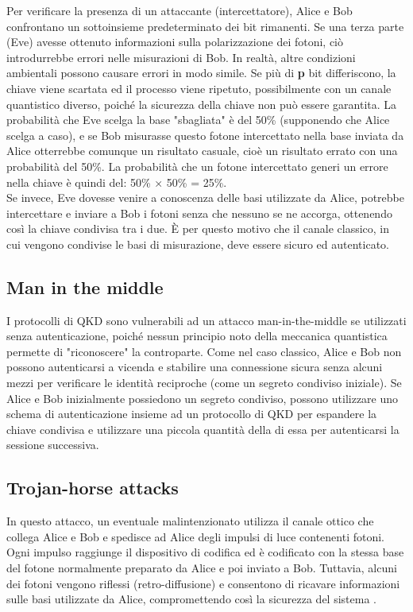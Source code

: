 \noindent Per verificare la presenza di un attaccante (intercettatore), Alice e Bob confrontano un sottoinsieme predeterminato dei bit rimanenti. Se una terza parte (Eve) avesse ottenuto informazioni sulla polarizzazione dei fotoni, ciò introdurrebbe errori nelle misurazioni di Bob. In realtà, altre condizioni ambientali possono causare errori in modo simile. Se più di \textbf{p} bit differiscono, la chiave viene scartata ed il processo viene ripetuto, possibilmente con un canale quantistico diverso, poiché la sicurezza della chiave non può essere garantita.
La probabilità che Eve scelga la base "sbagliata" è del 50\% (supponendo che Alice scelga a caso), e se Bob misurasse questo fotone intercettato nella base inviata da Alice otterrebbe comunque un risultato casuale, cioè un risultato errato con una probabilità del 50\%. La probabilità che un fotone intercettato generi un errore nella chiave è quindi del: 50\% × 50\% = 25\%. \\
Se invece, Eve dovesse venire a conoscenza delle basi utilizzate da Alice, potrebbe intercettare e inviare a Bob i fotoni senza che nessuno se ne accorga, ottenendo così la chiave condivisa tra i due. È per questo motivo che il canale classico, in cui vengono condivise le basi di misurazione, deve essere sicuro ed autenticato.

\subsection{Man in the middle}
I protocolli di  QKD sono vulnerabili ad un attacco man-in-the-middle se utilizzati senza autenticazione, poiché nessun principio noto della meccanica quantistica permette di "riconoscere" la controparte. Come nel caso classico, Alice e Bob non possono autenticarsi a vicenda e stabilire una connessione sicura senza alcuni mezzi per verificare le identità reciproche (come un segreto condiviso iniziale). Se Alice e Bob inizialmente possiedono un segreto condiviso, possono utilizzare uno schema di autenticazione insieme ad un protocollo di QKD per espandere la chiave condivisa e utilizzare una piccola quantità della di essa per autenticarsi la sessione successiva.

\subsection{Trojan-horse attacks}
In questo attacco, un eventuale malintenzionato utilizza il canale ottico che collega Alice e Bob e spedisce ad Alice degli impulsi di luce contenenti fotoni. Ogni impulso raggiunge il dispositivo di codifica ed è codificato con la stessa base del fotone normalmente preparato da Alice e poi inviato a Bob. Tuttavia, alcuni dei fotoni vengono riflessi (retro-diffusione) e consentono di ricavare informazioni sulle basi utilizzate da Alice, compromettendo così
la sicurezza del sistema \cite{gisin_trojan_2006}.

